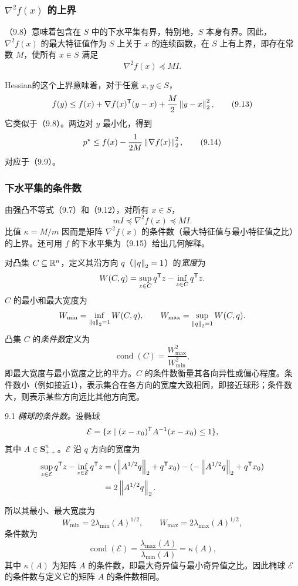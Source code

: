 \subsubsection*{$\nabla^2f(x)$ 的上界}
（9.8）意味着包含在 $S$ 中的下水平集有界，特别地，$S$ 本身有界。因此，$\nabla^2f(x)$ 的最大特征值作为 $S$ 上关于 $x$ 的连续函数，在 $S$ 上有上界，即存在常数 $M$，使所有 $x\in S$ 满足
\begin{equation}
\nabla^2f(x)\preceq MI.\tag{9.12}
\end{equation}

Hessian的这个上界意味着，对于任意 $x,y\in S$，
\begin{equation}
f(y)\le f(x)+\nabla f(x)^\mathsf T(y-x)+\frac M2\left\lVert y-x\right\rVert_2^2,\tag{9.13}
\end{equation}
它类似于（9.8）。两边对 $y$ 最小化，得到
\begin{equation}
p^\star\le f(x)-\frac1{2M}\left\lVert \nabla f(x)\right\rVert_2^2,\tag{9.14}
\end{equation}
对应于（9.9）。

\subsubsection*{下水平集的条件数}
由强凸不等式（9.7）和（9.12），对所有 $x\in S$，
\begin{equation}
mI\preceq\nabla^2f(x)\preceq MI.\tag{9.15}
\end{equation}
比值 $\kappa=M/m$ 因而是矩阵 $\nabla^2f(x)$ 的条件数（最大特征值与最小特征值之比）的上界。还可用 $f$ 的下水平集为（9.15）给出几何解释。

对凸集 $C\subseteq\mathbb R^n$，定义其沿方向 $q$（$\left\lVert q\right\rVert_2=1$）的\emph{宽度}为
\[
W(C,q)=\sup_{z\in C}q^\mathsf T z-\inf_{z\in C}q^\mathsf T z.
\]
$C$ 的最小和最大宽度为
\[
W_{\min}=\inf_{\left\lVert q\right\rVert_2=1}W(C,q),\qquad
W_{\max}=\sup_{\left\lVert q\right\rVert_2=1}W(C,q).
\]
凸集 $C$ 的\emph{条件数}定义为
\[
\operatorname{cond}(C)=\frac{W_{\max}^2}{W_{\min}^2},
\]
即最大宽度与最小宽度之比的平方。$C$ 的条件数衡量其各向异性或偏心程度。条件数小（例如接近1），表示集合在各方向的宽度大致相同，即接近球形；条件数大，则表示某些方向远比其他方向宽。

\begin{origexample}{9.1}
\emph{椭球的条件数。}设椭球
\[
\mathcal E=\{x\mid(x-x_0)^\mathsf T A^{-1}(x-x_0)\le1\},
\]
其中 $A\in\mathbf S_{++}^n$。$\mathcal E$ 沿 $q$ 方向的宽度为
\[
\begin{aligned}
\sup_{z\in\mathcal E}q^\mathsf T z-\inf_{z\in\mathcal E}q^\mathsf T z
&=(\left\lVert A^{1/2}q\right\rVert_2+q^\mathsf T x_0)-(-\left\lVert A^{1/2}q\right\rVert_2+q^\mathsf T x_0)\\
&=2\left\lVert A^{1/2}q\right\rVert_2.
\end{aligned}
\]

所以其最小、最大宽度为
\[
W_{\min}=2\lambda_{\min}(A)^{1/2},\qquad
W_{\max}=2\lambda_{\max}(A)^{1/2},
\]
条件数为
\[
\operatorname{cond}(\mathcal E)
=\frac{\lambda_{\max}(A)}{\lambda_{\min}(A)}=\kappa(A),
\]
其中 $\kappa(A)$ 为矩阵 $A$ 的条件数，即最大奇异值与最小奇异值之比。因此椭球 $\mathcal E$ 的条件数与定义它的矩阵 $A$ 的条件数相同。
\end{origexample}

